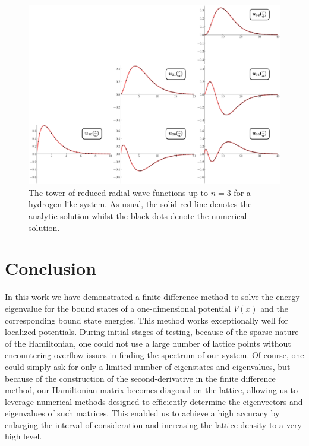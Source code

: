 \begin{figure}[h!tb]
    \centering
    \includegraphics[width=0.95\linewidth]{hydrogen_wfs.pdf}
    \caption{The tower of reduced radial wave-functions up to $n = 3$ for a hydrogen-like system. As usual, the solid red line denotes the analytic solution whilst the black dots denote the numerical solution.}
    \label{fig:hydrogen-wfs}
\end{figure}



\section{Conclusion}
\label{sec:conclusion}

In this work we have demonstrated a finite difference method to solve the energy eigenvalue for the bound states of a one-dimensional potential $V(x)$ and the corresponding bound state energies.
This method works exceptionally well for localized potentials.
During initial stages of testing, because of the sparse nature of the Hamiltonian, one could not use a large number of lattice points without encountering overflow issues in finding the spectrum of our system.
Of course, one could simply ask for only a limited number of eigenstates and eigenvalues, but because of the construction of the second-derivative in the finite difference method, our Hamiltonian matrix becomes diagonal on the lattice, allowing us to leverage numerical methods designed to efficiently determine the eigenvectors and eigenvalues of such matrices.
This enabled us to achieve a high accuracy by enlarging the interval of consideration and increasing the lattice density to a very high level.

